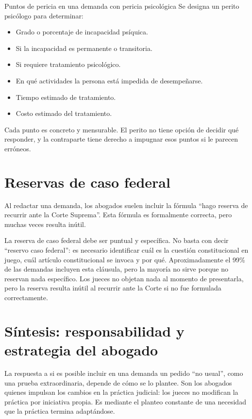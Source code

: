\documentclass[12pt,oneside]{book}
\begin{document}
\begin{example}{Puntos de pericia en una demanda con pericia psicológica}
Se designa un perito psicólogo para determinar:
\begin{itemize}
    \item Grado o porcentaje de incapacidad psíquica.
    \item Si la incapacidad es permanente o transitoria.
    \item Si requiere tratamiento psicológico.
    \item En qué actividades la persona está impedida de desempeñarse.
    \item Tiempo estimado de tratamiento.
    \item Costo estimado del tratamiento.
\end{itemize}
Cada punto es concreto y mensurable. El perito no tiene opción de decidir qué responder, y la contraparte tiene derecho a impugnar esos puntos si le parecen erróneos.
\end{example}

\section{Reservas de caso federal}

Al redactar una demanda, los abogados suelen incluir la fórmula ``hago reserva de recurrir ante la Corte Suprema''. Esta fórmula es formalmente correcta, pero muchas veces resulta inútil.

\begin{important}
La reserva de caso federal debe ser puntual y específica. No basta con decir ``reservo caso federal'': es necesario identificar cuál es la cuestión constitucional en juego, cuál artículo constitucional se invoca y por qué. Aproximadamente el 99\% de las demandas incluyen esta cláusula, pero la mayoría no sirve porque no reservan nada específico. Los jueces no objetan nada al momento de presentarla, pero la reserva resulta inútil al recurrir ante la Corte si no fue formulada correctamente.
\end{important}

\section{Síntesis: responsabilidad y estrategia del abogado}

La respuesta a si es posible incluir en una demanda un pedido ``no usual'', como una prueba extraordinaria, depende de cómo se lo plantee. Son los abogados quienes impulsan los cambios en la práctica judicial: los jueces no modifican la práctica por iniciativa propia. Es mediante el planteo constante de una necesidad que la práctica termina adaptándose.
\end{document}
